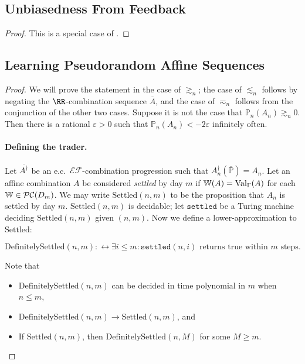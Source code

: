 \documentclass[authordate,onecolumn,noenvironments]{miri-tech-article}
\numberwithin{equation}{subsection}
\newcommand{\seq}[1]{{\overline{#1}}}
\newcommand{\mm}{m}
\newcommand{\nn}{n}
\newcommand{\ec}[1][\ ]{e.c.#1}
\newcommand{\exfeatures}{\mathcal{E\!F}} %
\newcommand{\aff}{A}
\newcommand{\gens}{\dagger}
\newcommand{\gen}[1]{{#1^\gens}}
\newcommand{\BelState}{\mathbb{P}}
\newcommand{\pt}{\BelState}
\newcommand{\MP}{\seq{\pt}}
\newcommand{\ftn}{(\MP)} %
\newcommand{\dt}{D}
\newcommand{\pcworlds}{\mathcal{P\-C}}
\newcommand{\World}{\mathbb{W}}
\newcommand{\Theory}{\Gamma}
\newcommand{\thmval}[1][\Theory]{\operatorname{Val}_{#1}\-} %
\begin{document}
\subsection{Unbiasedness From Feedback}\label{app:wub}

\restatewub*

\begin{proof}
  This is a special case of .
\end{proof}


\subsection{Learning Pseudorandom Affine Sequences}\label{app:prandaff}

\prandaff*

\begin{proof}

  We will prove the statement in the case of $\gtrsim_n$; the case of $\lesssim_n$ follows by negating the $\RR$-combination sequence $\seq\aff$, and the case of $\eqsim_n$ follows from the conjunction of the other two cases.
Suppose it is not the case that $\pt_\nn(\aff_\nn) \gtrsim_\nn 0$.
Then there is a rational $\varepsilon > 0$ such that $\pt_\nn(\aff_\nn) < - 2 \varepsilon$ infinitely often.


\newcommand{\DefinitelySettled}{\mathrm{DefinitelySettled}}

\paragraph{Defining the trader.}
  Let $\seq{\gen\aff}$ be an \ec $\exfeatures$-combination 
   progression such that $\gen{\aff_n} \ftn = \aff_n$.
Let an affine combination $\aff$ be considered \emph{settled} by day $m$ if $\World(\aff) = \thmval(\aff)$ for each $\World \in \pcworlds(\dt_m)$.
We may write $\mathrm{Settled}(\nn, m)$ to be the proposition that $\aff_\nn$ is settled by day $\mm$.
$\mathrm{Settled}(\nn, m)$ is decidable; let $\texttt{settled}$ be a Turing machine deciding $\mathrm{Settled}(\nn, m)$ given $(\nn, m)$.
Now we define a lower-approximation to $\mathrm{Settled}$:

\[ \DefinitelySettled(\nn, m) :\leftrightarrow \exists i \leq m: \texttt{settled}(\nn, i) \text{~returns true within $m$ steps}. \]

Note that
\begin{itemize}
\item $\DefinitelySettled(\nn, m)$ can be decided in time polynomial in $m$ when $\nn \leq m$,
\item $\DefinitelySettled(\nn, m) \rightarrow \mathrm{Settled}(\nn, m)$, and
\item If $\mathrm{Settled}(\nn, m)$, then $\DefinitelySettled(\nn, M)$ for some $M \geq m$.
\end{itemize}


\end{proof}
\end{document}
